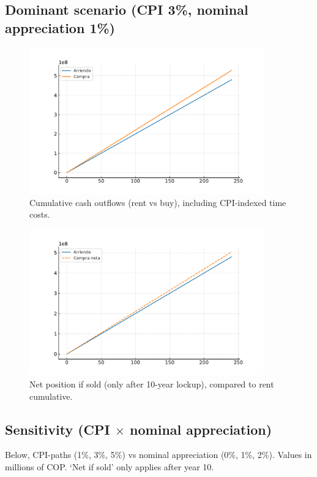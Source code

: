 \documentclass[12pt]{article}
\begin{document}
\subsection*{Dominant scenario (CPI 3\%, nominal appreciation 1\%)}
\begin{figure}[h]
\centering
\includegraphics[width=0.9\textwidth]{cash_outflows_dominant.pdf}
\caption{Cumulative cash outflows (rent vs buy), including CPI-indexed time costs.}
\end{figure}

\begin{figure}[h]
\centering
\includegraphics[width=0.9\textwidth]{net_if_sold_dominant.pdf}
\caption{Net position if sold (only after 10-year lockup), compared to rent cumulative.}
\end{figure}

\subsection*{Sensitivity (CPI $\times$ nominal appreciation)}
Below, CPI-paths (1\%, 3\%, 5\%) vs nominal appreciation (0\%, 1\%, 2\%). Values in millions of COP. `Net if sold' only applies after year 10.
\end{document}
